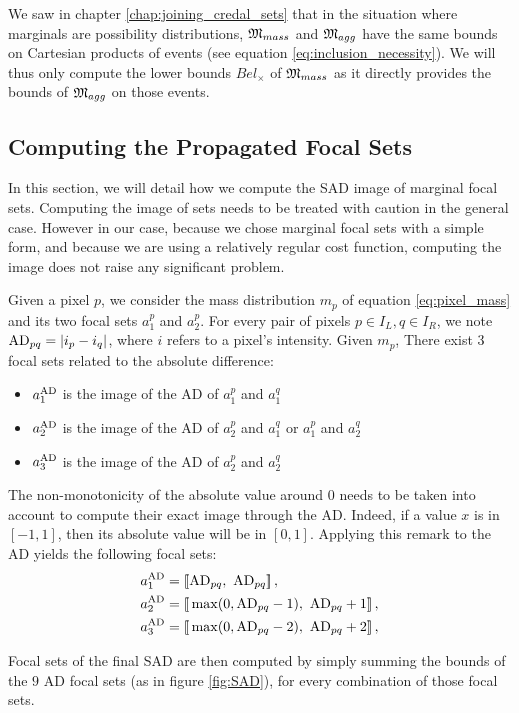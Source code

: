 We saw in chapter \ref{chap:joining_credal_sets} that in the situation where marginals are possibility distributions, ${\mathfrak{M}}_{mass}$ and ${\mathfrak{M}}_{agg}$ have the same bounds on Cartesian products of events (see equation \eqref{eq:inclusion_necessity}). We will thus only compute the lower bounds $Bel_\times$ of ${\mathfrak{M}}_{mass}$ as it directly provides the bounds of ${\mathfrak{M}}_{agg}$ on those events.

\subsection{Computing the Propagated Focal Sets}\label{sec:propagated_focal_sets}
In this section, we will detail how we compute the SAD image of marginal focal sets. Computing the image of sets needs to be treated with caution in the general case. However in our case, because we chose marginal focal sets with a simple form, and because we are using a relatively regular cost function, computing the image does not raise any significant problem.

Given a pixel $p$, we consider the mass distribution $m_p$ of equation \eqref{eq:pixel_mass} and its two focal sets $a_1^p$ and $a_2^p$. For every pair of pixels $p\in I_L, q\in I_R$, we note ${\mathrm{AD}}_{pq}=|i_p - i_q|$, where $i$ refers to a pixel's intensity. Given $m_p$, There exist $3$ focal sets related to the absolute difference:
\begin{itemize}
    \item $a^{{\mathrm{AD}}}_1$ is the image of the AD of $a^p_1$ and $a^q_1$
    \item $a^{{\mathrm{AD}}}_2$ is the image of the AD of $a^p_2$ and $a^q_1$ or $a^p_1$ and $a^q_2$
    \item  $a^{{\mathrm{AD}}}_3$ is the image of the AD of $a^p_2$ and $a^q_2$
\end{itemize}
The non-monotonicity of the absolute value around $0$ needs to be taken into account to compute their exact image through the AD. Indeed, if a value $x$ is in $[-1,1]$, then its absolute value will be in $[0,1]$. Applying this remark to the AD yields the following focal sets:
\begin{align*}
    a^{{\mathrm{AD}}}_1&={[\![}{\mathrm{AD}}_{pq},~{\mathrm{AD}}_{pq}{]\!]}\,,\\
    a^{{\mathrm{AD}}}_2&={[\![}\max(0, {\mathrm{AD}}_{pq} - 1),~{\mathrm{AD}}_{pq} + 1{]\!]}\,,\\
    a^{{\mathrm{AD}}}_3&={[\![}\max(0, {\mathrm{AD}}_{pq} - 2),~{\mathrm{AD}}_{pq} + 2{]\!]}\,,
\end{align*}

Focal sets of the final SAD are then computed by simply summing the bounds of the $9$ AD focal sets (as in figure \ref{fig:SAD}), for every combination of those focal sets. 

